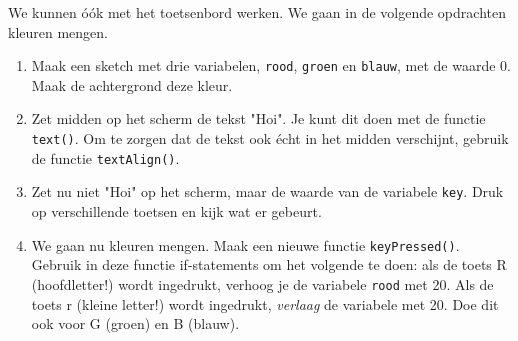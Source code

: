 \documentclass[a4paper,11pt]{article}
\begin{document}
We kunnen óók met het toetsenbord werken.  We gaan in de volgende
opdrachten kleuren mengen.

\begin{enumerate}
\item Maak een sketch met drie variabelen, \verb|rood|, \verb|groen| en
\verb|blauw|, met de waarde 0.  Maak de achtergrond deze kleur.
\item Zet midden op het scherm de tekst "Hoi".  Je kunt dit doen met de
functie \verb|text()|.  Om te zorgen dat de tekst ook écht in het midden
verschijnt, gebruik de functie \verb|textAlign()|.
\item Zet nu niet "Hoi" op het scherm, maar de waarde van de variabele
\verb|key|.  Druk op verschillende toetsen en kijk wat er gebeurt.
\item We gaan nu kleuren mengen.  Maak een nieuwe functie
\verb|keyPressed()|.  Gebruik in deze functie if-statements om het
volgende te doen: als de toets R (hoofdletter!) wordt ingedrukt, verhoog
je de variabele \verb|rood| met 20.  Als de toets r (kleine letter!) wordt
ingedrukt, \emph{verlaag} de variabele met 20.  Doe dit ook voor G (groen)
en B (blauw).
\end{enumerate}
\end{document}
